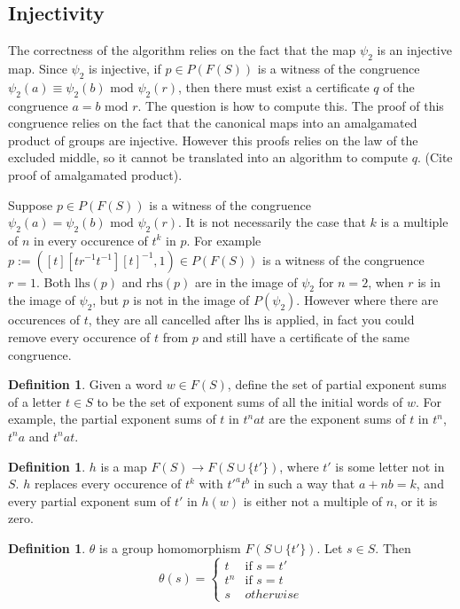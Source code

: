 \documentclass[11pt]{article} %
\theoremstyle{definition}
\theoremstyle{definition}
\theoremstyle{definition}
\theoremstyle{definition}
\theoremstyle{definition}
\newtheorem{defn}[theorem]{Definition}
\theoremstyle{definition}
\begin{document}
\subsection{Injectivity}\label{powproof}

The correctness of the algorithm relies on the fact that the map $\psi_2$ is an injective map.
Since $\psi_2$ is injective, if $p \in P(F(S))$ is a witness of the congruence
$\psi_2(a) \equiv \psi_2(b) \text{ mod } \psi_2(r)$, then there must exist a certificate
$q$ of the congruence $a = b \text{ mod }r$. The question is how to compute this. The proof
of this congruence relies on the fact that the canonical maps into an amalgamated product
of groups are injective. However this proofs relies on the law of the excluded middle, so
it cannot be translated into an algorithm to compute $q$. (Cite proof of amalgamated product).

Suppose $p \in P(F(S))$ is a witness of the congruence
$\psi_2(a) = \psi_2(b) \text{ mod } \psi_2(r)$. It is not necessarily the case that $k$
is a multiple of $n$ in every occurence of $t^k$ in $p$. For example
$p := ([t][tr^{-1}t^{-1}][t]^{-1}, 1) \in P(F(S))$ is a witness of the congruence
$r = 1$. Both $\text{lhs}(p)$ and $\text{rhs}(p)$ are in the image of
$\psi_2$ for $n = 2$, when $r$ is in the image of $\psi_2$,
but $p$ is not in the image of $P(\psi_2)$. However where there are
occurences of $t$, they are all cancelled after $\text{lhs}$ is applied, in fact
you could remove every occurence of $t$ from $p$ and still have a certificate of the same
congruence.

\begin{defn}
  Given a word $w \in F(S)$, define the set of partial exponent sums of a letter $t \in S$ to
  be the set of exponent sums of all the initial words of $w$. For example, the partial
  exponent sums of $t$ in $t^n a t$ are the exponent sums of $t$ in
  $t^n$, $t^na$ and $t^nat$.
\end{defn}

\begin{defn}
  $h$ is a map $F(S) \to F(S \cup \{t'\})$, where $t'$ is some letter not in $S$.
  $h$ replaces every occurence of $t^k$ with $t'^at^b$ in such a way that $a + n b = k$,
  and every partial exponent sum of $t'$ in $h(w)$ is either not a multiple of $n$,
  or it is zero.
\end{defn}

\begin{defn}
  $\theta$ is a group homomorphism $F(S \cup \{t'\})$. Let $s \in S$. Then
  \begin{equation}
    \theta(s) = \begin{cases}
      t & \text{if } s = t' \\
      t^n & \text{if } s = t \\
      s & otherwise
    \end{cases}
  \end{equation}
\end{defn}
\end{document}
